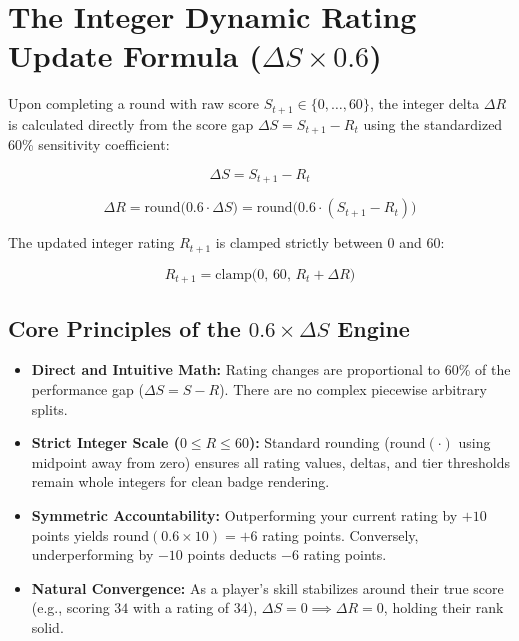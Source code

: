 \section{The Integer Dynamic Rating Update Formula ($\Delta S \times 0.6$)}
Upon completing a round with raw score $S_{t+1} \in \{0, \dots, 60\}$, the integer delta $\Delta R$ is calculated directly from the score gap $\Delta S = S_{t+1} - R_t$ using the standardized 60\% sensitivity coefficient:

\begin{equation}
\Delta S = S_{t+1} - R_t
\end{equation}

\begin{equation}
\Delta R = \text{round}\big(0.6 \cdot \Delta S\big) = \text{round}\big(0.6 \cdot (S_{t+1} - R_t)\big)
\end{equation}

The updated integer rating $R_{t+1}$ is clamped strictly between 0 and 60:

\begin{equation}
R_{t+1} = \text{clamp}\big(0, \, 60, \, R_t + \Delta R\big)
\end{equation}

\subsection{Core Principles of the $0.6 \times \Delta S$ Engine}
\begin{itemize}
    \item \textbf{Direct and Intuitive Math:} Rating changes are proportional to 60\% of the performance gap ($\Delta S = S - R$). There are no complex piecewise arbitrary splits.
    \item \textbf{Strict Integer Scale ($0 \le R \le 60$):} Standard rounding ($\text{round}(\cdot)$ using midpoint away from zero) ensures all rating values, deltas, and tier thresholds remain whole integers for clean badge rendering.
    \item \textbf{Symmetric Accountability:} Outperforming your current rating by $+10$ points yields $\text{round}(0.6 \times 10) = +6$ rating points. Conversely, underperforming by $-10$ points deducts $-6$ rating points.
    \item \textbf{Natural Convergence:} As a player's skill stabilizes around their true score (e.g., scoring $34$ with a rating of $34$), $\Delta S = 0 \implies \Delta R = 0$, holding their rank solid.
\end{itemize}

